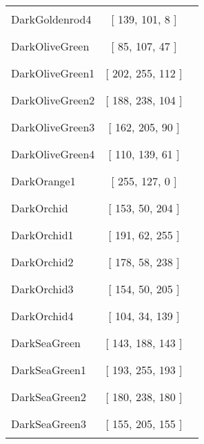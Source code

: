 \begin{tabular}{|l|c|c|}
DarkGoldenrod4 & [ 139, 101, 8 ] & \color{DarkGoldenrod4} \rule{1cm}{1.5ex}\\
DarkOliveGreen & [ 85, 107, 47 ] & \color{DarkOliveGreen} \rule{1cm}{1.5ex}\\
DarkOliveGreen1 & [ 202, 255, 112 ] & \color{DarkOliveGreen1} \rule{1cm}{1.5ex}\\
DarkOliveGreen2 & [ 188, 238, 104 ] & \color{DarkOliveGreen2} \rule{1cm}{1.5ex}\\
DarkOliveGreen3 & [ 162, 205, 90 ] & \color{DarkOliveGreen3} \rule{1cm}{1.5ex}\\
DarkOliveGreen4 & [ 110, 139, 61 ] & \color{DarkOliveGreen4} \rule{1cm}{1.5ex}\\
DarkOrange1 & [ 255, 127, 0 ] & \color{DarkOrange1} \rule{1cm}{1.5ex}\\
DarkOrchid & [ 153, 50, 204 ] & \color{DarkOrchid} \rule{1cm}{1.5ex}\\
DarkOrchid1 & [ 191, 62, 255 ] & \color{DarkOrchid1} \rule{1cm}{1.5ex}\\
DarkOrchid2 & [ 178, 58, 238 ] & \color{DarkOrchid2} \rule{1cm}{1.5ex}\\
DarkOrchid3 & [ 154, 50, 205 ] & \color{DarkOrchid3} \rule{1cm}{1.5ex}\\
DarkOrchid4 & [ 104, 34, 139 ] & \color{DarkOrchid4} \rule{1cm}{1.5ex}\\
DarkSeaGreen & [ 143, 188, 143 ] & \color{DarkSeaGreen} \rule{1cm}{1.5ex}\\
DarkSeaGreen1 & [ 193, 255, 193 ] & \color{DarkSeaGreen1} \rule{1cm}{1.5ex}\\
DarkSeaGreen2 & [ 180, 238, 180 ] & \color{DarkSeaGreen2} \rule{1cm}{1.5ex}\\
DarkSeaGreen3 & [ 155, 205, 155 ] & \color{DarkSeaGreen3} \rule{1cm}{1.5ex}\\
\end{tabular}


